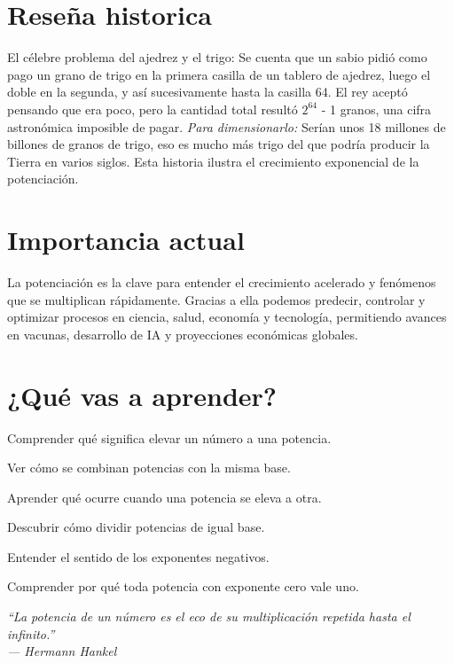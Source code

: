 
\vspace{1cm}

\vspace{1em} %
\section*{Reseña historica}
\begin{reseñaplana}
El célebre problema del ajedrez y el trigo:
Se cuenta que un sabio pidió como pago un grano de trigo en la primera casilla de un tablero de ajedrez, 
luego el doble en la segunda, y así sucesivamente hasta la casilla 64. El rey aceptó pensando que era poco, 
pero la cantidad total resultó $2^{64}$ - 1 granos, una cifra astronómica imposible de pagar.
\textit{Para dimensionarlo:} Serían unos 18 millones de billones de granos de trigo, eso es mucho más trigo 
del que podría producir la Tierra en varios siglos.
Esta historia ilustra el crecimiento exponencial de la potenciación.
\end{reseñaplana}

\section*{Importancia actual}
\begin{reseñaplana}
La potenciación es la clave para entender el crecimiento acelerado y 
fenómenos que se multiplican rápidamente. Gracias a ella podemos predecir, controlar y 
optimizar procesos en ciencia, salud, economía y tecnología, permitiendo avances en vacunas, 
desarrollo de IA y proyecciones económicas globales.
\end{reseñaplana}

\section*{¿Qué vas a aprender?}
\begin{reseñaitem}
  \item Comprender qué significa elevar un número a una potencia.  
  \item Ver cómo se combinan potencias con la misma base.  
  \item Aprender qué ocurre cuando una potencia se eleva a otra.  
  \item Descubrir cómo dividir potencias de igual base.  
  \item Entender el sentido de los exponentes negativos.  
  \item Comprender por qué toda potencia con exponente cero vale uno.
\end{reseñaitem}

\vspace{1.5cm} %
\begin{flushright}
  {\fontsize{12}{14}\selectfont\itshape
  ``La potencia de un número es el eco de su multiplicación repetida hasta el infinito.''\\[6pt]
  — Hermann Hankel}%
\end{flushright}



